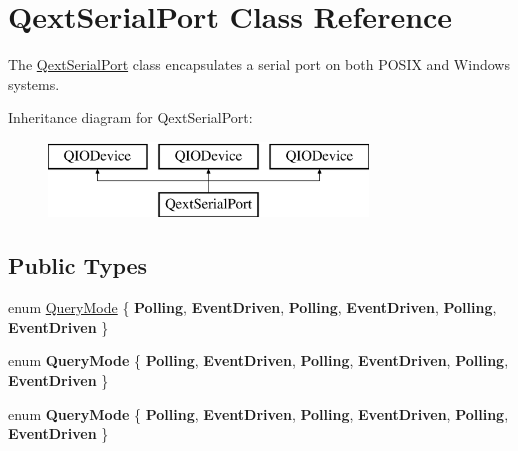 \hypertarget{class_qext_serial_port}{}\section{Qext\+Serial\+Port Class Reference}
\label{class_qext_serial_port}


The \mbox{\hyperlink{class_qext_serial_port}{Qext\+Serial\+Port}} class encapsulates a serial port on both P\+O\+S\+IX and Windows systems.  


Inheritance diagram for Qext\+Serial\+Port\+:\begin{figure}[H]
\begin{center}
\leavevmode
\includegraphics[height=2.000000cm]{class_qext_serial_port}
\end{center}
\end{figure}
\subsection*{Public Types}
\begin{DoxyCompactItemize}
\item 
enum \mbox{\hyperlink{class_qext_serial_port_a269e1f3656224a10c321bd70ab89cf64}{Query\+Mode}} \{ \newline
{\bfseries Polling}, 
{\bfseries Event\+Driven}, 
{\bfseries Polling}, 
{\bfseries Event\+Driven}, 
\newline
{\bfseries Polling}, 
{\bfseries Event\+Driven}
 \}
\item 
\mbox{\label{class_qext_serial_port_a269e1f3656224a10c321bd70ab89cf64}} 
enum {\bfseries Query\+Mode} \{ \newline
{\bfseries Polling}, 
{\bfseries Event\+Driven}, 
{\bfseries Polling}, 
{\bfseries Event\+Driven}, 
\newline
{\bfseries Polling}, 
{\bfseries Event\+Driven}
 \}
\item 
\mbox{\label{class_qext_serial_port_a269e1f3656224a10c321bd70ab89cf64}} 
enum {\bfseries Query\+Mode} \{ \newline
{\bfseries Polling}, 
{\bfseries Event\+Driven}, 
{\bfseries Polling}, 
{\bfseries Event\+Driven}, 
\newline
{\bfseries Polling}, 
{\bfseries Event\+Driven}
 \}
\end{DoxyCompactItemize}
